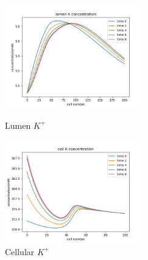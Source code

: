 \documentclass{article}
\begin{document}
\begin{figure}[H]
\centering
\begin{minipage}[t]{0.48\textwidth}
\centering
\includegraphics[width=6cm]{figure/figure15.png}
\caption{Lumen $K^{+}$}
\end{minipage}
\begin{minipage}[t]{0.48\textwidth}
\centering
\includegraphics[width=6cm]{figure/figure16.png}
\caption{Cellular $K^{+}$}
\end{minipage}
\end{figure}
\end{document}
